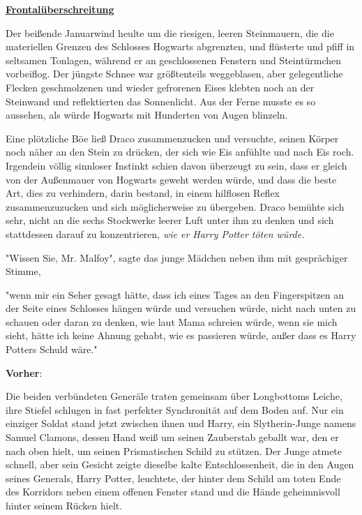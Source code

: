 

\hypertarget{frontaluxfcberschreitungen}{%

\textbf{\uline{Frontalüberschreitung}}

Der beißende Januarwind heulte um die riesigen, leeren Steinmauern, die die materiellen Grenzen des Schlosses Hogwarts abgrenzten, und flüsterte und pfiff in seltsamen Tonlagen, während er an geschlossenen Fenstern und Steintürmchen vorbeiflog. Der jüngste Schnee war größtenteils weggeblasen, aber gelegentliche Flecken geschmolzenen und wieder gefrorenen Eises klebten noch an der Steinwand und reflektierten das Sonnenlicht. Aus der Ferne musste es so aussehen, als würde Hogwarts mit Hunderten von Augen blinzeln.

Eine plötzliche Böe ließ Draco zusammenzucken und versuchte, seinen Körper noch näher an den Stein zu drücken, der sich wie Eis anfühlte und nach Eis roch. Irgendein völlig sinnloser Instinkt schien davon überzeugt zu sein, dass er gleich von der Außenmauer von Hogwarts geweht werden würde, und dass die beste Art, dies zu verhindern, darin bestand, in einem hilflosen Reflex zusammenzuzucken und sich möglicherweise zu übergeben. Draco bemühte sich sehr, nicht an die sechs Stockwerke leerer Luft unter ihm zu denken und sich stattdessen darauf zu konzentrieren, \emph{wie er Harry Potter töten würde.}

"Wissen Sie, Mr. Malfoy", sagte das junge Mädchen neben ihm mit gesprächiger Stimme,

"wenn mir ein Seher gesagt hätte, dass ich eines Tages an den Fingerspitzen an der Seite eines Schlosses hängen würde und versuchen würde, nicht nach unten zu schauen oder daran zu denken, wie laut Mama schreien würde, wenn sie mich sieht, hätte ich keine Ahnung gehabt, wie es passieren würde, außer dass es Harry Potters Schuld wäre."

\textbf{Vorher}:

Die beiden verbündeten Generäle traten gemeinsam über Longbottoms Leiche, ihre Stiefel schlugen in fast perfekter Synchronität auf dem Boden auf. Nur ein einziger Soldat stand jetzt zwischen ihnen und Harry, ein Slytherin-Junge namens Samuel Clamons, dessen Hand weiß um seinen Zauberstab geballt war, den er nach oben hielt, um seinen Prismatischen Schild zu stützen. Der Junge atmete schnell, aber sein Gesicht zeigte dieselbe kalte Entschlossenheit, die in den Augen seines Generals, Harry Potter, leuchtete, der hinter dem Schild am toten Ende des Korridors neben einem offenen Fenster stand und die Hände geheimnisvoll hinter seinem Rücken hielt.

}
